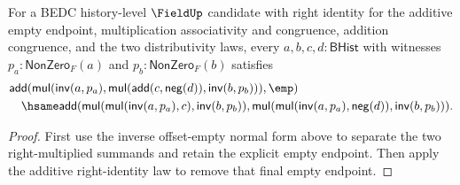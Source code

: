 \begin{lemma}
\label{lem:field-affine-inverse-empty-offset-normal-form}
For a BEDC history-level $\FieldUp$ candidate with right identity for the
additive empty endpoint, multiplication associativity and congruence, addition
congruence, and the two distributivity laws, every
$a,b,c,d:\mathsf{BHist}$ with witnesses \(p_a:\mathsf{NonZero}_F(a)\) and
\(p_b:\mathsf{NonZero}_F(b)\) satisfies
$$
\begin{aligned}
&\mathsf{add}(
  \mathsf{mul}(\mathsf{inv}(a,p_a),
    \mathsf{mul}(\mathsf{add}(c,\mathsf{neg}(d)),
      \mathsf{inv}(b,p_b))),\emp)\\
&\quad\hsame
\mathsf{add}(
  \mathsf{mul}(\mathsf{mul}(\mathsf{inv}(a,p_a),c),
    \mathsf{inv}(b,p_b)),
  \mathsf{mul}(\mathsf{mul}(\mathsf{inv}(a,p_a),\mathsf{neg}(d)),
    \mathsf{inv}(b,p_b))).
\end{aligned}
$$
\end{lemma}
\begin{proof}
First use the inverse offset-empty normal form above to separate the two
right-multiplied summands and retain the explicit empty endpoint. Then apply
the additive right-identity law to remove that final empty endpoint.
\end{proof}

